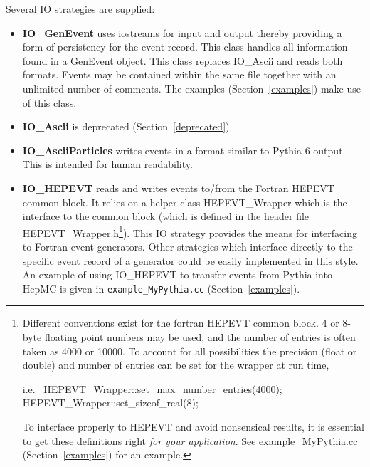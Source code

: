 \documentclass[11pt,letterpaper]{article}
\begin{document}
Several IO strategies are supplied:
\begin{itemize}\setlength{\itemsep}{0pt}
  \item {\bf IO\_GenEvent} uses iostreams for input and output
    thereby providing a form of persistency for the event record. 
    This class handles all information found in a GenEvent object.
    This class replaces IO\_Ascii and reads both formats.
    Events may be contained within the same file together with
    an unlimited number of comments. 
    The examples (Section~\ref{examples}) make use of this class.
  \item {\bf IO\_Ascii} is deprecated (Section~\ref{deprecated}).
  \item {\bf IO\_AsciiParticles} writes events in a format similar to 
     Pythia 6 output.  This is intended for human readability.
  \item {\bf IO\_HEPEVT} reads and writes events to/from the Fortran HEPEVT
    common block. It relies on a helper class HEPEVT\_Wrapper which
    is the interface to the common block
    (which is defined in the header file HEPEVT\_Wrapper.h\footnote{
      Different conventions exist for the fortran HEPEVT common
      block. 4 or 8-byte floating point numbers may be used, and the
      number of entries is often taken as 4000 or 10000. To account for
      all possibilities the precision (float or double) and number of
      entries can be set for the wrapper at run time,
      \begin{tabbing}
      i.e.\ \hspace{1cm} \= HEPEVT\_Wrapper::set\_max\_number\_entries(4000);\\
                         \> HEPEVT\_Wrapper::set\_sizeof\_real(8); 
            \hspace{1cm} .
      \end{tabbing}
      To interface properly to HEPEVT and avoid nonsensical
      results, it is essential to get these definitions right
      {\it for your application}. See example\_MyPythia.cc
      (Section~\ref{examples}) for an example.
      }).
    This IO strategy
    provides the means for interfacing to Fortran event
    generators. Other strategies which interface directly to the
    specific event record of a generator could be easily implemented
    in this style. An example of using IO\_HEPEVT to transfer events
    from Pythia into HepMC is given in \verb!example_MyPythia.cc! 
    (Section~\ref{examples}).
\end{itemize}
\end{document}
